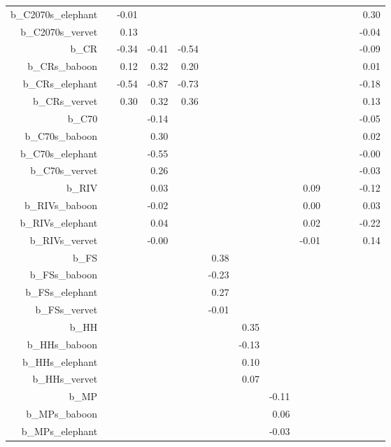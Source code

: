 \begin{table}[ht]
\begin{tabular}{rrrrrrrrrrrrr}
  b\_C2070s\_elephant &  & -0.01 &  &  &  &  &  &  &  &  &  & 0.30 \\ 
  b\_C2070s\_vervet &  & 0.13 &  &  &  &  &  &  &  &  &  & -0.04 \\ 
  b\_CR &  & -0.34 & -0.41 & -0.54 &  &  &  &  &  &  &  & -0.09 \\ 
  b\_CRs\_baboon &  & 0.12 & 0.32 & 0.20 &  &  &  &  &  &  &  & 0.01 \\ 
  b\_CRs\_elephant &  & -0.54 & -0.87 & -0.73 &  &  &  &  &  &  &  & -0.18 \\ 
  b\_CRs\_vervet &  & 0.30 & 0.32 & 0.36 &  &  &  &  &  &  &  & 0.13 \\ 
  b\_C70 &  &  & -0.14 &  &  &  &  &  &  &  &  & -0.05 \\ 
  b\_C70s\_baboon &  &  & 0.30 &  &  &  &  &  &  &  &  & 0.02 \\ 
  b\_C70s\_elephant &  &  & -0.55 &  &  &  &  &  &  &  &  & -0.00 \\ 
  b\_C70s\_vervet &  &  & 0.26 &  &  &  &  &  &  &  &  & -0.03 \\ 
  b\_RIV &  &  & 0.03 &  &  &  &  & 0.09 &  &  &  & -0.12 \\ 
  b\_RIVs\_baboon &  &  & -0.02 &  &  &  &  & 0.00 &  &  &  & 0.03 \\ 
  b\_RIVs\_elephant &  &  & 0.04 &  &  &  &  & 0.02 &  &  &  & -0.22 \\ 
  b\_RIVs\_vervet &  &  & -0.00 &  &  &  &  & -0.01 &  &  &  & 0.14 \\ 
  b\_FS &  &  &  &  & 0.38 &  &  &  &  &  &  &  \\ 
  b\_FSs\_baboon &  &  &  &  & -0.23 &  &  &  &  &  &  &  \\ 
  b\_FSs\_elephant &  &  &  &  & 0.27 &  &  &  &  &  &  &  \\ 
  b\_FSs\_vervet &  &  &  &  & -0.01 &  &  &  &  &  &  &  \\ 
  b\_HH &  &  &  &  &  & 0.35 &  &  &  &  &  &  \\ 
  b\_HHs\_baboon &  &  &  &  &  & -0.13 &  &  &  &  &  &  \\ 
  b\_HHs\_elephant &  &  &  &  &  & 0.10 &  &  &  &  &  &  \\ 
  b\_HHs\_vervet &  &  &  &  &  & 0.07 &  &  &  &  &  &  \\ 
  b\_MP &  &  &  &  &  &  & -0.11 &  &  &  &  &  \\ 
  b\_MPs\_baboon &  &  &  &  &  &  & 0.06 &  &  &  &  &  \\ 
  b\_MPs\_elephant &  &  &  &  &  &  & -0.03 &  &  &  &  &  \\ 

\end{tabular}
\end{table}
